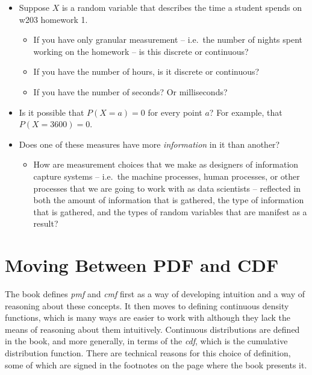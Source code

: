 \documentclass[
  letterpaper,
  DIV=11,
  numbers=noendperiod]{scrreprt}
\providecommand{\tightlist}{%
  \setlength{\itemsep}{0pt}\setlength{\parskip}{0pt}}\usepackage{longtable,booktabs,array}
\begin{document}
\begin{itemize}
\tightlist
\item
  Suppose \(X\) is a random variable that describes the time a student
  spends on w203 homework 1.

  \begin{itemize}
  \tightlist
  \item
    If you have only granular measurement -- i.e.~the number of nights
    spent working on the homework -- is this discrete or continuous?
  \item
    If you have the number of hours, is it discrete or continuous?
  \item
    If you have the number of seconds? Or milliseconds?
  \end{itemize}
\item
  Is it possible that \(P(X = a) = 0\) for every point \(a\)? For
  example, that \(P(X = 3600) = 0\).
\item
  Does one of these measures have more \emph{information} in it than
  another?

  \begin{itemize}
  \tightlist
  \item
    How are measurement choices that we make as designers of information
    capture systems -- i.e.~the machine processes, human processes, or
    other processes that we are going to work with as data scientists --
    reflected in both the amount of information that is gathered, the
    type of information that is gathered, and the types of random
    variables that are manifest as a result?
  \end{itemize}
\end{itemize}

\section{Moving Between PDF and CDF}\label{moving-between-pdf-and-cdf}

The book defines \emph{pmf} and \emph{cmf} first as a way of developing
intuition and a way of reasoning about these concepts. It then moves to
defining continuous density functions, which is many ways are easier to
work with although they lack the means of reasoning about them
intuitively. Continuous distributions are defined in the book, and more
generally, in terms of the \emph{cdf}, which is the cumulative
distribution function. There are technical reasons for this choice of
definition, some of which are signed in the footnotes on the page where
the book presents it.
\end{document}
